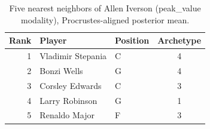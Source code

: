 \begin{table}[htbp]
  \centering\small
  \begin{tabular}{rllc}
    \toprule
    Rank & Player & Position & Archetype \\
    \midrule
    1 & Vladimir Stepania & C & 4 \\
    2 & Bonzi Wells & G & 4 \\
    3 & Corsley Edwards & C & 3 \\
    4 & Larry Robinson & G & 1 \\
    5 & Renaldo Major & F & 3 \\
    \bottomrule
  \end{tabular}
  \caption{Five nearest neighbors of Allen Iverson (peak_value modality), Procrustes-aligned posterior mean.}
  \label{tab:Allen_Iverson_neighbors_peak_value}
\end{table}

